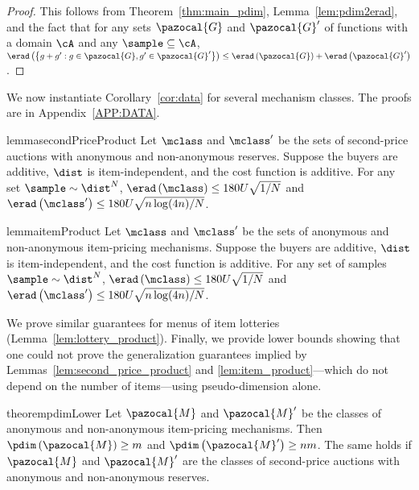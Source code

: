 \begin{proof}
This follows from Theorem~\ref{thm:main_pdim}, Lemma~\ref{lem:pdim2erad}, and the fact that for any sets $\pazocal{G}$ and $\pazocal{G}'$ of functions with a domain $\cA$ and any $\sample \subseteq \cA$, $\erad\left(\left\{g + g' : g \in \pazocal{G}, g' \in \pazocal{G}'\right\}\right) \leq \erad\left(\pazocal{G}\right) + \erad\left(\pazocal{G}'\right)$.
\end{proof}

We now instantiate Corollary~\ref{cor:data} for several mechanism classes. The proofs are in Appendix~\ref{APP:DATA}.

\begin{restatable}{lemma}{secondPriceProduct}\label{lem:second_price_product}
Let $\mclass$ and $\mclass'$ be the sets of second-price auctions with anonymous and non-anonymous reserves. Suppose the buyers are additive, $\dist$ is item-independent, and the cost function is additive. For any set $\sample \sim \dist^N$, $\erad\left(\mclass\right) \leq 180U\sqrt{1/N}$ and $\erad\left(\mclass'\right) \leq 180U\sqrt{n \log (4n)/N}$.
\end{restatable}

\begin{restatable}{lemma}{itemProduct}\label{lem:item_product}
Let $\mclass$ and $\mclass'$ be the sets of anonymous and non-anonymous item-pricing mechanisms. Suppose the buyers are additive, $\dist$ is item-independent, and the cost function is additive. For any set of samples $\sample \sim \dist^N$, $\erad\left(\mclass\right) \leq 180U\sqrt{1/N}$ and $\erad\left(\mclass'\right) \leq 180U\sqrt{n \log (4n)/N}$.
\end{restatable}

We prove similar guarantees for menus of item lotteries (Lemma~\ref{lem:lottery_product}).
Finally, we provide lower bounds showing that one could not prove the generalization guarantees implied by Lemmas~\ref{lem:second_price_product} and \ref{lem:item_product}---which do not depend on the number of items---using pseudo-dimension alone.
\begin{restatable}{theorem}{pdimLower}\label{thm:pdim_lower}
Let $\pazocal{M}$ and $\pazocal{M}'$ be the classes of anonymous and non-anonymous item-pricing mechanisms. Then $\pdim\left(\pazocal{M}\right) \geq m$ and $\pdim\left(\pazocal{M}'\right) \geq nm$. The same holds if $\pazocal{M}$ and $\pazocal{M}'$ are the classes of second-price auctions with anonymous and non-anonymous reserves.
\end{restatable}